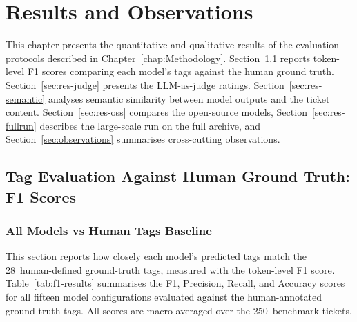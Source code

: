 \chapter{Results and Observations}
%
\label{chap:Results}
%
This chapter presents the quantitative and qualitative results of the
evaluation protocols described in Chapter~\ref{chap:Methodology}.
Section~\ref{sec:res-f1} reports token-level F1 scores comparing each model's
tags against the human ground truth.
Section~\ref{sec:res-judge} presents the LLM-as-judge ratings.
Section~\ref{sec:res-semantic} analyses semantic similarity between model
outputs and the ticket content.
Section~\ref{sec:res-oss} compares the open-source models,
Section~\ref{sec:res-fullrun} describes the large-scale run on the full archive, and
Section~\ref{sec:observations} summarises cross-cutting observations.

\section{Tag Evaluation Against Human Ground Truth: F1 Scores}
\label{sec:res-f1}
%
\subsection{All Models vs Human Tags Baseline}
\label{subsec:f1-all}
%
This section reports how closely each model's predicted tags match the
28~human-defined ground-truth tags, measured with the token-level F1 score.
Table~\ref{tab:f1-results} summarises the F1, Precision, Recall,
and Accuracy scores for all fifteen model configurations evaluated against
the human-annotated ground-truth tags.  All scores are macro-averaged over
the 250~benchmark tickets.

